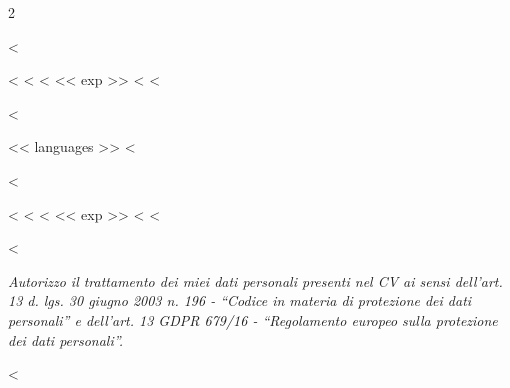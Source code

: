 \documentclass[10pt,a4paper,withhyper]{altacv}
\begin{document}
\begin{paracol}{2}


<%

 <%
 <%
\divider
 <%
  << exp >>
 <%
<%

<%


<< languages >>
<%

\medskip

<%


 <%
 <%
\divider
 <%
 << exp >>
 <%
<%




\end{paracol}

<%

\vfill
\begin{center}
\textit {\small Autorizzo il trattamento dei miei dati personali presenti nel CV ai sensi dell’art. 13 d. lgs. 30 giugno 2003 n. 196 - “Codice in materia di
protezione dei dati personali” e dell’art. 13 GDPR 679/16 - “Regolamento europeo sulla protezione dei dati personali”.}
\end{center}

<%
\end{document}
